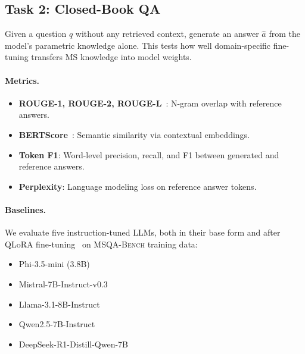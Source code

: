 \documentclass[11pt]{article}
\newcommand{\msqa}{\textsc{MSQA-Bench}}
\begin{document}
\subsection{Task 2: Closed-Book QA}
\label{sec:task_closedbook}

Given a question $q$ without any retrieved context, generate an answer $\hat{a}$ from the model's parametric knowledge alone. This tests how well domain-specific fine-tuning transfers MS knowledge into model weights.

\paragraph{Metrics.}
\begin{itemize}[leftmargin=*,itemsep=1pt]
    \item \textbf{ROUGE-1, ROUGE-2, ROUGE-L}~\citep{lin2004rouge}: N-gram overlap with reference answers.
    \item \textbf{BERTScore}~\citep{zhang2020bertscore}: Semantic similarity via contextual embeddings.
    \item \textbf{Token F1}: Word-level precision, recall, and F1 between generated and reference answers.
    \item \textbf{Perplexity}: Language modeling loss on reference answer tokens.
\end{itemize}

\paragraph{Baselines.} We evaluate five instruction-tuned LLMs, both in their base form and after QLoRA fine-tuning~\citep{dettmers2024qlora} on \msqa{} training data:
\begin{itemize}[leftmargin=*,itemsep=1pt]
    \item Phi-3.5-mini (3.8B)~\citep{abdin2024phi3}
    \item Mistral-7B-Instruct-v0.3~\citep{jiang2023mistral}
    \item Llama-3.1-8B-Instruct~\citep{dubey2024llama}
    \item Qwen2.5-7B-Instruct~\citep{qwen2025qwen25}
    \item DeepSeek-R1-Distill-Qwen-7B~\citep{guo2025deepseek}
\end{itemize}

\end{document}
